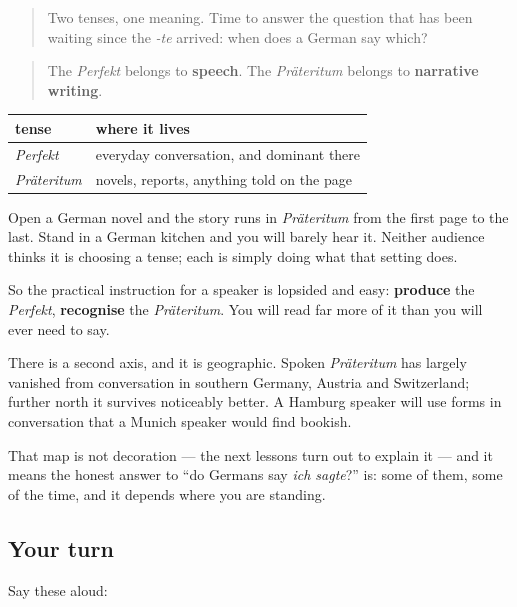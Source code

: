 \begin{quote}
Two tenses, one meaning. Time to answer the question that has been waiting since the \emph{-te} arrived: when does a German say which?
\end{quote}

\begin{grammarlens}[title={Grammar Lens: speech takes one, writing takes the other}]
\begin{quote}
The \emph{Perfekt} belongs to \textbf{speech}. The \emph{Präteritum} belongs to \textbf{narrative writing}.
\end{quote}

\noindent
\begin{tabularx}{\linewidth}{@{}>{\raggedright\arraybackslash}X>{\raggedright\arraybackslash}X@{}}
\toprule
\textbf{tense} & \textbf{where it lives} \\
\midrule
\emph{Perfekt} & everyday conversation, and dominant there \\
\emph{Präteritum} & novels, reports, anything told on the page \\
\bottomrule
\end{tabularx}

Open a German novel and the story runs in \emph{Präteritum} from the first page to the last. Stand in a German kitchen and you will barely hear it. Neither audience thinks it is choosing a tense; each is simply doing what that setting does.

So the practical instruction for a speaker is lopsided and easy: \textbf{produce} the \emph{Perfekt}, \textbf{recognise} the \emph{Präteritum}. You will read far more of it than you will ever need to say.
\end{grammarlens}

\begin{culture}
There is a second axis, and it is geographic. Spoken \emph{Präteritum} has largely vanished from conversation in southern Germany, Austria and Switzerland; further north it survives noticeably better. A Hamburg speaker will use forms in conversation that a Munich speaker would find bookish.

That map is not decoration — the next lessons turn out to explain it — and it means the honest answer to \textquotedblleft{}do Germans say \emph{ich sagte}?\textquotedblright{} is: some of them, some of the time, and it depends where you are standing.
\end{culture}

\subsection*{Your turn}
Say these aloud:

